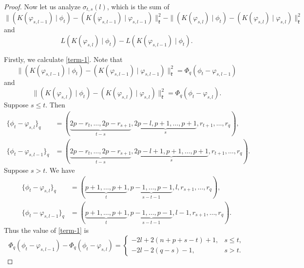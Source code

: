\documentclass[11pt]{amsart}
\theoremstyle{plain}
\theoremstyle{definition}
\newcommand{\frk}{\mathfrak{k}}
\begin{document}
\begin{proof}
Now let us analyze $\sigma_{t,s}(l)$, which is the sum of
\begin{equation}\label{term-1}
\|(K(\varphi_{s, l-1})\mid\phi_t) - (K(\varphi_{s, l-1})\mid\varphi_{s, l-1})\|_{\frk}^2 - \|(K(\varphi_{s, l})\mid\phi_t) - (K(\varphi_{s, l})\mid\varphi_{s, l})\|_{\frk}^2
\end{equation}
and
\begin{equation}\label{term-2}
L(K(\varphi_{s, l})\mid\phi_t)- L(K(\varphi_{s, l-1})\mid\phi_t).
\end{equation}

Firstly, we calculate \eqref{term-1}. Note that
\[\|(K(\varphi_{s, l-1})\mid\phi_t) - (K(\varphi_{s, l-1})\mid\varphi_{s, l-1})\|_{\frk}^2=\Phi_q(\phi_t-\varphi_{s,{l-1}})\]
and
\[\|(K(\varphi_{s, l})\mid\phi_t) - (K(\varphi_{s, l})\mid\varphi_{s, l})\|_{\frk}^2=\Phi_q(\phi_t-\varphi_{s,l}).\]
 Suppose $s\le t$. Then
\begin{align*}
	\{\phi_t-\varphi_{s,l}\}_q&=(\underbrace{2p-r_t,\dots,2p-r_{s+1}}_{t-s},\underbrace{2p-l,p+1,\dots,p+1}_{s},r_{t+1},\dots,r_q),\\
	\{\phi_t-\varphi_{s,l-1}\}_q&=(\underbrace{2p-r_t,\dots,2p-r_{s+1}}_{t-s},\underbrace{2p-l+1,p+1,\dots,p+1}_{s},r_{t+1},\dots,r_q).
\end{align*}
Suppose $s>t$. We have
\begin{align*}
	\{\phi_t-\varphi_{s,l}\}_q&=(\underbrace{p+1,\dots,p+1}_{t},\underbrace{p-1,\dots,p-1}_{s-t-1},l,r_{s+1},\dots,r_q),\\
	\{\phi_t-\varphi_{s,l-1}\}_q&=(\underbrace{p+1,\dots,p+1}_{t},\underbrace{p-1,\dots,p-1}_{s-t-1},l-1,r_{s+1},\dots,r_q).
\end{align*}
Thus the value of \eqref{term-1} is
\begin{equation}\label{term-1-1}
\Phi_q(\phi_t-\varphi_{s,{l-1}})-\Phi_q(\phi_t-\varphi_{s,l})=\left\{
\begin{array}{ll}
	-2l+2(n+p+s-t)+1, & s\le t,\\
	-2l-2(q-s)-1,& s>t.
\end{array}
\right.
\end{equation}



\end{proof}
\end{document}
